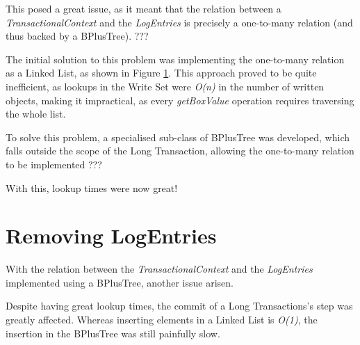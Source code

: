 This posed a great issue, as it meant that the relation between a {\it
  TransactionalContext} and the {\it LogEntries} is precisely a
one-to-many relation (and thus backed by a BPlusTree). ???

The initial solution to this problem was implementing the one-to-many
relation as a Linked List, as shown in Figure
\ref{fig:linkedList}. This approach proved to be quite inefficient, as
lookups in the Write Set were {\it O(n)} in the number of written
objects, making it impractical, as every {\it getBoxValue} operation
requires traversing the whole list.

\begin{figure}
  \centering

\caption{}
\label{fig:linkedList}
\end{figure}

To solve this problem, a specialised sub-class of BPlusTree was
developed, which falls outside the scope of the Long Transaction,
allowing the one-to-many relation to be implemented ???

With this, lookup times were now great!

\section{Removing LogEntries}

With the relation between the {\it TransactionalContext} and the {\it
  LogEntries} implemented using a BPlusTree, another issue arisen. 

Despite having great lookup times, the commit of a Long Transactions's
step was greatly affected. Whereas inserting elements in a Linked List
is {\it O(1)}, the insertion in the BPlusTree was still painfully
slow.

